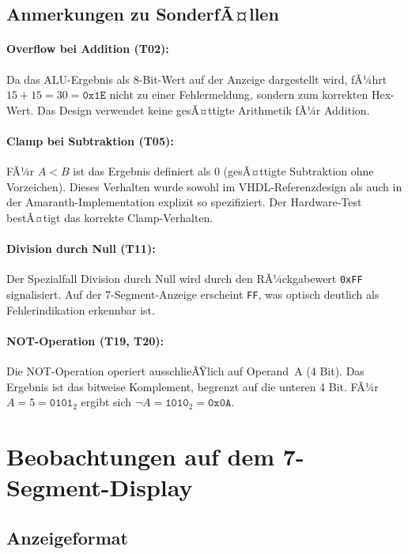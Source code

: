 ﻿\documentclass[12pt,a4paper]{report}
\begin{document}
\subsection{Anmerkungen zu SonderfÃ¤llen}
\label{subsec:sonderfaelle}

\paragraph{Overflow bei Addition (T02):}
Da das ALU-Ergebnis als 8-Bit-Wert auf der Anzeige dargestellt wird, fÃ¼hrt $15 + 15 = 30 = \texttt{0x1E}$ nicht zu einer Fehlermeldung, sondern zum korrekten Hex-Wert. Das Design verwendet keine gesÃ¤ttigte Arithmetik fÃ¼r Addition.

\paragraph{Clamp bei Subtraktion (T05):}
FÃ¼r $A < B$ ist das Ergebnis definiert als $0$ (gesÃ¤ttigte Subtraktion ohne Vorzeichen). Dieses Verhalten wurde sowohl im VHDL-Referenzdesign als auch in der Amaranth-Implementation explizit so spezifiziert. Der Hardware-Test bestÃ¤tigt das korrekte Clamp-Verhalten.

\paragraph{Division durch Null (T11):}
Der Spezialfall Division durch Null wird durch den RÃ¼ckgabewert \texttt{0xFF} signalisiert. Auf der 7-Segment-Anzeige erscheint \texttt{FF}, was optisch deutlich als Fehlerindikation erkennbar ist.

\paragraph{NOT-Operation (T19, T20):}
Die NOT-Operation operiert ausschlieÃŸlich auf Operand~A (4 Bit). Das Ergebnis ist das bitweise Komplement, begrenzt auf die unteren 4 Bit. FÃ¼r $A = 5 = \texttt{0101}_2$ ergibt sich $\lnot A = \texttt{1010}_2 = \texttt{0x0A}$.

\section{Beobachtungen auf dem 7-Segment-Display}
\label{sec:display_beobachtungen}

\subsection{Anzeigeformat}
\label{subsec:anzeigeformat}
\end{document}
